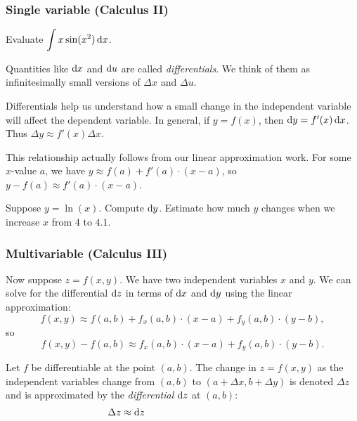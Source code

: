 \subsubsection{Single variable (Calculus II)}
\begin{ex}
    Evaluate $\displaystyle\int x\sin(x^2)\mathop{}\!\mathrm{d} x$.
\end{ex}

\vspace{1.2in}

Quantities like $\mathop{}\!\mathrm{d} x$ and $\mathop{}\!\mathrm{d} u$ are called \emph{differentials}. We think of them as infinitesimally small versions of $\Delta x$ and $\Delta u$.
\medskip 

Differentials help us understand how a small change in the independent variable will affect the dependent variable. In general, if $y=f(x)$, then $\mathop{}\!\mathrm{d} y=f'(x)\mathop{}\!\mathrm{d} x$. Thus $\Delta y\approx f'(x)\Delta x$.
\medskip

This relationship actually follows from our linear approximation work. For some $x$-value $a$, we have $y\approx f(a)+f'(a)\cdot(x-a)$, so $y-f(a) \approx f'(a)\cdot(x-a)$.

\vspace{.5in}

\begin{ex}
    Suppose $y=\ln(x)$. Compute $\mathop{}\!\mathrm{d} y$. Estimate how much $y$ changes when we increase $x$ from $4$ to $4.1$.
\end{ex}

\pagebreak 

\subsubsection{Multivariable (Calculus III)}
Now suppose $z=f(x,y)$. We have two independent variables $x$ and $y$. We can solve for the differential $\mathop{}\!\mathrm{d} z$ in terms of $\mathop{}\!\mathrm{d} x$ and $\mathop{}\!\mathrm{d} y$ using the linear approximation:
\[
    f(x,y)\approx f(a,b)+f_x(a,b)\cdot(x-a)+f_y(a,b)\cdot(y-b),
\] 
so
\[
    f(x,y)-f(a,b)\approx f_x(a,b)\cdot(x-a)+f_y(a,b)\cdot(y-b).
\]
\bigskip 

\begin{defn}
Let $f$ be differentiable at the point $(a,b)$. The change in $z=f(x,y)$ as the independent variables change from $(a,b)$ to $(a+\Delta x, b+\Delta y)$ is denoted $\Delta z$ and is approximated by the \emph{differential} $\mathop{}\!\mathrm{d} z$ at $(a,b)$:
\[
    \Delta z\approx \dif z \phantom{= f_x(a,b)\dx + f_y(a,b)\dy.}
\]
\vspace{.6in}
\end{defn}

